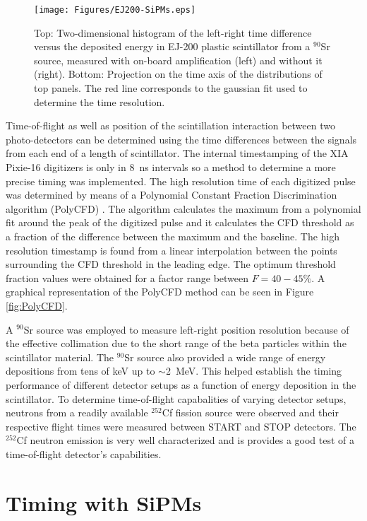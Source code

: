 \begin{figure}[tp]
\centering
\texttt{[image: Figures/EJ200-SiPMs.eps]}
\caption{Top: Two-dimensional histogram of the left-right time difference versus the deposited energy in EJ-200 plastic scintillator from a $^{90}$Sr source, measured with on-board amplification (left) and without it (right). Bottom: Projection on the time axis of the  distributions of top panels. The red line corresponds to the gaussian fit used to determine the time resolution.}
\label{fig:SiPMtiming}
\end{figure}
Time-of-flight as well as position of the scintillation interaction between two photo-detectors can be determined using the time differences between the signals from each end of a length of scintillator. The internal timestamping of the XIA Pixie-16 digitizers is only in 8~ns intervals so a method to determine a more precise timing was implemented.
The high resolution time of each digitized pulse was determined by means of a Polynomial Constant Fraction Discrimination  algorithm (PolyCFD) \cite{PhDCory}. The algorithm calculates the maximum from a polynomial fit around the peak of the digitized pulse and it calculates the CFD threshold as a fraction of the difference between the maximum and the baseline. The high resolution timestamp is found from a linear interpolation between the points surrounding the CFD threshold in the leading edge. The optimum threshold fraction values were obtained for a factor range between $F=40-45\%$. A graphical representation of the PolyCFD method can be seen in Figure \ref{fig:PolyCFD}.

A $^{90}$Sr source was employed to measure left-right position resolution because of the effective collimation due to the short range of the beta particles within the scintillator material. The $^{90}$Sr source also provided a wide range of energy depositions from tens of keV up to $\sim$2~MeV. This helped establish the timing performance of different detector setups as a function of energy deposition in the scintillator. To determine time-of-flight capabalities of varying detector setups, neutrons from a readily available $^{252}$Cf fission source were observed and their respective flight times were measured between START and STOP detectors. The $^{252}$Cf neutron emission is very well characterized and is provides a good test of a time-of-flight detector's capabilities. 

\section{Timing with SiPMs} \label{sec:timingWithSiPMs}

